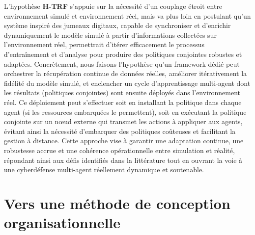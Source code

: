\noindent L'hypothèse \textbf{H-TRF} s'appuie sur la nécessité d'un couplage étroit entre environnement simulé et environnement réel, mais va plus loin en postulant qu'un système inspiré des jumeaux digitaux, capable de synchroniser et d'enrichir dynamiquement le modèle simulé à partir d'informations collectées sur l'environnement réel, permettrait d'itérer efficacement le processus d'entraînement et d'analyse pour produire des politiques conjointes robustes et adaptées. Concrètement, nous faisons l'hypothèse qu'un framework dédié peut orchestrer la récupération continue de données réelles, améliorer itérativement la fidélité du modèle simulé, et enclencher un cycle d'apprentissage multi-agent dont les résultats (politiques conjointes) sont ensuite déployés dans l'environnement réel. Ce déploiement peut s'effectuer soit en installant la politique dans chaque agent (si les ressources embarquées le permettent), soit en exécutant la politique conjointe sur un nœud externe qui transmet les actions à appliquer aux agents, évitant ainsi la nécessité d'embarquer des politiques coûteuses et facilitant la gestion à distance. Cette approche vise à garantir une adaptation continue, une robustesse accrue et une cohérence opérationnelle entre simulation et réalité, répondant ainsi aux défis identifiés dans la littérature tout en ouvrant la voie à une cyberdéfense multi-agent réellement dynamique et soutenable.



\section{Vers une méthode de conception organisationnelle}

